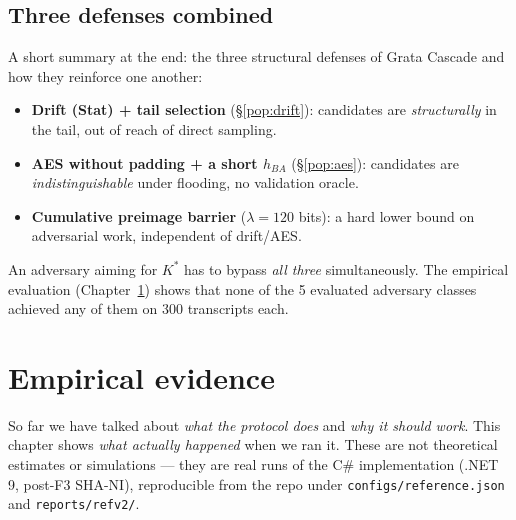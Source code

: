 \documentclass[11pt,a4paper]{article}
\begin{document}
\subsection{Three defenses combined}

A short summary at the end: the three structural defenses of Grata Cascade and how they reinforce one another:

\begin{itemize}[leftmargin=*]
\item \textbf{Drift (Stat) + tail selection} (§\ref{pop:drift}): candidates are \emph{structurally} in the tail, out of reach of direct sampling.
\item \textbf{AES without padding + a short $h_{BA}$} (§\ref{pop:aes}): candidates are \emph{indistinguishable} under flooding, no validation oracle.
\item \textbf{Cumulative preimage barrier} ($\lambda = 120$ bits): a hard lower bound on adversarial work, independent of drift/AES.
\end{itemize}

An adversary aiming for $K^*$ has to bypass \emph{all three} simultaneously. The empirical evaluation (Chapter~\ref{pop:empirical}) shows that none of the 5 evaluated adversary classes achieved any of them on 300 transcripts each.

\section{Empirical evidence}\label{pop:empirical}

So far we have talked about \emph{what the protocol does} and \emph{why it should work}. This chapter shows \emph{what actually happened} when we ran it. These are not theoretical estimates or simulations --- they are real runs of the C\# implementation (.NET 9, post-F3 SHA-NI), reproducible from the repo under \texttt{configs/reference.json} and \texttt{reports/refv2/}.
\end{document}
